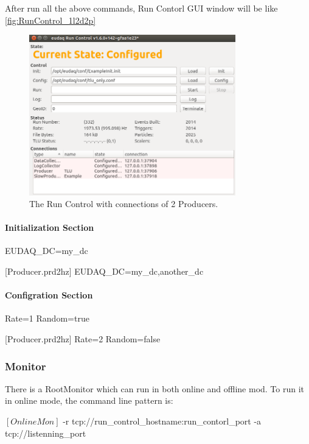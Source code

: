 After run all the above commands, Run Contorl GUI window will be like \autoref{fig:RunControl_1l2d2p}

\begin{figure}[htb]
  \begin{center}
    \includegraphics[width=0.8\textwidth]{src/images/RunControl}
    \caption{The Run Control with connections of 2 Producers.}
    \label{fig:RunControl_1l2d2p}
  \end{center}
\end{figure}

\paragraph{Initialization Section}
\begin{listing}
EUDAQ_DC=my_dc

[Producer.prd2hz]
EUDAQ_DC=my_dc,another_dc
\end{listing}

\paragraph{Configration Section}
\begin{listing}
Rate=1
Random=true

[Producer.prd2hz]
Rate=2
Random=false
\end{listing}


\subsubsection{Monitor}
\label{sec:onlinemonitor}
There is a RootMonitor which can run in both online and offline mod.
To run it in online mode, the command line pattern is:
\begin{listing}[mybash]
$[OnlineMon]$ -r tcp://{run_control_hostname}:{run_contorl_port} -a tcp://{listenning_port}
\end{listing}

